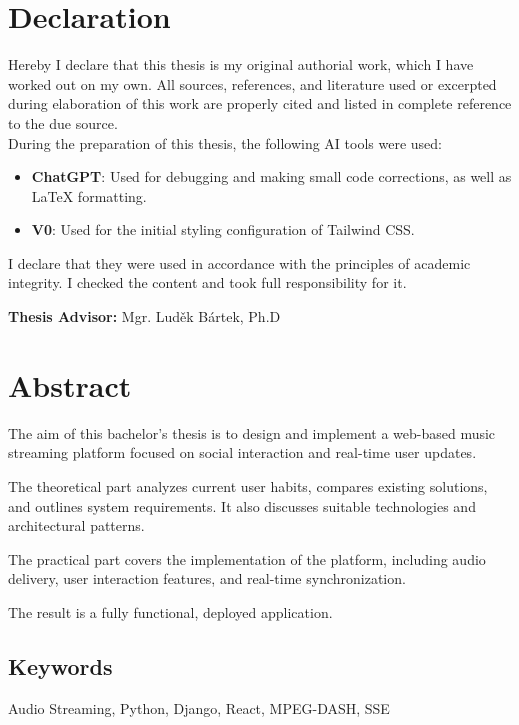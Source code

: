 \section*{Declaration}
Hereby I declare that this thesis is my original authorial work, which I have worked out on my own. All
sources, references, and literature used or excerpted during elaboration of this work are properly cited and
listed in complete reference to the due source.
\\
During the preparation of this thesis, the following AI tools were used:

\begin{itemize}
    \item \textbf{ChatGPT}: Used for debugging and making small code corrections, as well as LaTeX formatting.
    \item \textbf{V0}: Used for the initial styling configuration of Tailwind CSS.
\end{itemize}

I declare that they were used in accordance with the principles of academic integrity.
I checked the content and took full responsibility for it.

\vfill\noindent
\textbf{Thesis Advisor:} Mgr. Luděk Bártek, Ph.D
\cleardoublepage

\section*{Abstract}

The aim of this bachelor's thesis is to design and implement
a web-based music streaming platform focused on social interaction and
real-time user updates.

The theoretical part analyzes current user habits,
compares existing solutions, and outlines system requirements.
It also discusses suitable technologies and architectural patterns.

The practical part covers the implementation of the platform,
including audio delivery,
user interaction features, and real-time synchronization.

The result is a fully functional, deployed application.

\subsection*{Keywords}
Audio Streaming, Python, Django, React, MPEG-DASH, SSE
